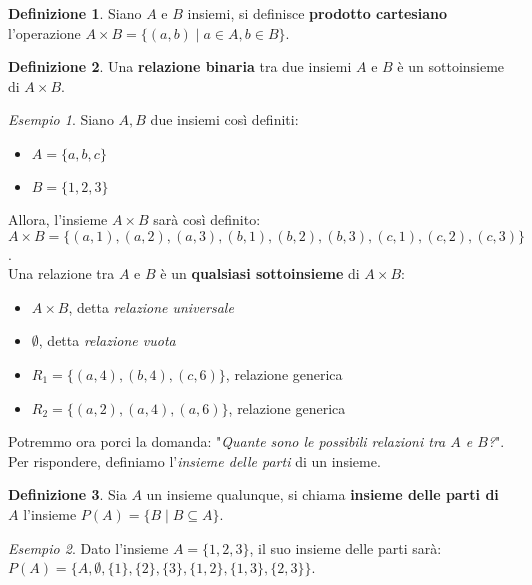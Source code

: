 \documentclass[a4paper, 12pt]{report}
\theoremstyle{definition}
\newtheorem{definition}{Definizione}[chapter]
\theoremstyle{remark}
\newtheorem{example}{Esempio}[definition]
\theoremstyle{plain}
\begin{document}
\begin{definition}
    Siano $A$ e $B$ insiemi, si definisce \textbf{prodotto cartesiano} l'operazione $A \times B = \{(a, b) \mid a \in A, b \in B\}$.
\end{definition}

\begin{definition}
    Una \textbf{relazione binaria} tra due insiemi $A$ e $B$ è un sottoinsieme di $A \times B$.
\end{definition}

\begin{example}
    Siano $A, B$ due insiemi così definiti:
    \begin{itemize}
        \item $A = \{a, b, c\}$
        \item $B = \{1, 2, 3\}$
    \end{itemize}
    Allora, l'insieme $A \times B$ sarà così definito:\\
    $A \times B = \{(a, 1), (a, 2), (a, 3), (b, 1), (b, 2), (b, 3), (c, 1), (c, 2), (c, 3)\}$.\\
    Una relazione tra $A$ e $B$ è un \textbf{qualsiasi sottoinsieme} di $A \times B$:
    \begin{itemize}
        \item $A \times B$, detta \textit{relazione universale}
        \item $\emptyset$, detta \textit{relazione vuota}
        \item $R_1 = \{(a, 4), (b, 4), (c, 6)\}$, relazione generica
        \item $R_2 = \{(a, 2), (a, 4), (a, 6)\}$, relazione generica
    \end{itemize}
\end{example}

Potremmo ora porci la domanda: "\textit{Quante sono le possibili relazioni tra $A$ e $B$?}". Per rispondere, definiamo l'\textit{insieme delle parti} di un insieme.

\begin{definition}
    Sia $A$ un insieme qualunque, si chiama \textbf{insieme delle parti di $A$} l'insieme $P(A) = \{B \mid B \subseteq A\}$.
\end{definition}

\begin{example}
    Dato l'insieme $A = \{1, 2, 3\}$, il suo insieme delle parti sarà: $P(A) = \{A, \emptyset, \{1\}, \{2\}, \{3\}, \{1, 2\}, \{1, 3\}, \{2, 3\}\}$.
\end{example}
\end{document}
